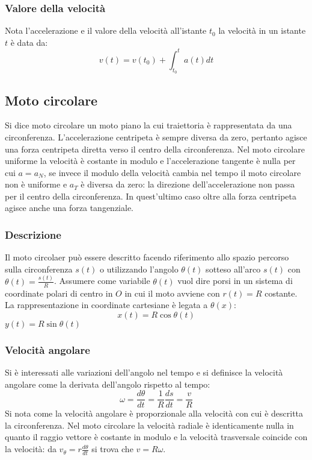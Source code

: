 		\subsubsection{Valore della velocit\`a}
		Nota l'accelerazione e il valore della velocit\`a all'istante $t_0$ la velocit\`a in un istante $t$ \`e data da:
		$$v(t)=v(t_0)+\int_{t_0}^ta(t)dt$$

	\subsection{Moto circolare}
	Si dice moto circolare un moto piano la cui traiettoria \`e rappresentata da una circonferenza.
	L'accelerazione centripeta \`e sempre diversa da zero, pertanto agisce una forza centripeta diretta verso il centro della circonferenza.
	Nel moto circolare uniforme la velocit\`a \`e costante in modulo e l'accelerazione tangente \`e nulla per cui $a=a_N$, se invece il modulo della velocit\`a cambia nel tempo il moto circolare non \`e uniforme e $a_T$ \`e diversa da zero: la direzione dell'accelerazione non passa per il centro della circonferenza.
	In quest'ultimo caso oltre alla forza centripeta agisce anche una forza tangenziale.

		\subsubsection{Descrizione}
		Il moto circolaer pu\`o essere descritto facendo riferimento allo spazio percorso sulla circonferenza $s(t)$ o utilizzando l'angolo $\theta(t)$ sotteso all'arco $s(t)$ con $\theta(t)=\frac{s(t)}{R}$.
		Assumere come variabile $\theta(t)$ vuol dire porsi in un sistema di coordinate polari di centro in $O$ in cui il moto avviene con $r(t)=R$ costante.
		La rappresentazione in coordinate cartesiane \`e legata a $\theta(x)$:
		$$x(t)=R\cos\theta(t)$$
		$y(t)=R\sin\theta(t)$

		\subsubsection{Velocit\`a angolare}
		Si \`e interessati alle variazioni dell'angolo nel tempo e si definisce la velocit\`a angolare come la derivata dell'angolo rispetto al tempo:
		$$\omega=\dfrac{d\theta}{dt}=\dfrac{1}{R}\dfrac{ds}{dt}=\dfrac{v}{R}$$
		Si nota come la velocit\`a angolare \`e proporzionale alla velocit\`a con cui \`e descritta la circonferenza.
		Nel moto circolare la velocit\`a radiale \`e identicamente nulla in quanto il raggio vettore \`e costante in modulo e la velocit\`a trasversale coincide con la velocit\`a: da $v_\theta=r\frac{d\theta}{dt}$ si trova che $v=R\omega$.

